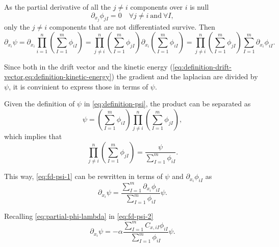 As the partial derivative of all the $j \not= i$ components over $i$ is null 
\begin{equation}
    \partial_{x_j} \phi_{jI} = 0\quad \forall j \not= i\ \mathrm{and}\ \forall I,
\end{equation}
only the $j\not= i$ components that are not differentiated survive. Then 
\begin{equation} \label{eq:fd-psi-1}
    \partial_{x_i} \psi 
    =
    \partial_{x_i} \prod_{i=1}^{n} \left( \sum_{I=1}^{m} \phi_{iI} \right)
    =
    \prod_{j\not=i}^{n} \left( \sum_{I=1}^{m} \phi_{jI} \right)
    \partial_{x_i} \left( \sum_{I=1}^{m} \phi_{iI} \right)
    =
    \prod_{j\not=i}^{n} \left( \sum_{I=1}^{m} \phi_{jI} \right)
    \sum_{I=1}^{m} \partial_{x_i} \phi_{iI}
    .
\end{equation}

Since both in the drift vector and the kinetic energy 
(\cref{eq:definition-drift-vector,eq:definition-kinetic-energy}) the gradient and the laplacian
are divided by $\psi$, it is convinient to express those in terms of
$\psi$.

Given the definition of $\psi$ in \cref{eq:definition-psi}, the product can be
separated as
\begin{equation}
    \psi =
    \left( \sum_{I=1}^{m} \phi_{iI} \right)
    \prod_{j\not=i}^{n} \left( \sum_{I=1}^{m} \phi_{jI} \right)
    ,
\end{equation}
which implies that
\begin{equation}
    \prod_{j\not=i}^{n} \left( \sum_{I=1}^{m} \phi_{jI} \right)
    =
    \frac{\psi}{
        \sum_{I=1}^{m} \phi_{iI}
    }
    .
\end{equation}

This way, \cref{eq:fd-psi-1} can be rewritten in terms of $\psi$ and 
$\partial_{x_i} \phi_{iI}$ as
\begin{equation} \label{eq:fd-psi-2}
    \partial_{x_i} \psi 
    =
    \frac{
        \sum_{I=1}^{m} \partial_{x_i} \phi_{iI}
    }{
        \sum_{I=1}^{m} \phi_{iI}
    }
    \psi
    .
\end{equation}

Recalling \cref{eq:partial-phi-lambda} in \cref{eq:fd-psi-2}
\begin{equation} \label{eq:derivada-psi-xi}
    \partial_{x_i} \psi 
    =
    -\alpha
    \frac{
        \sum_{I=1}^{m} 
        C_{x,iI}
        \phi_{iI} 
    }{
        \sum_{I=1}^{m} \phi_{iI}
    }
    \psi
    .
\end{equation}

